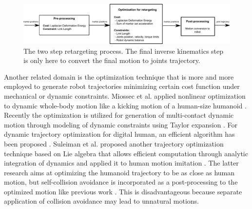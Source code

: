 \documentclass[letterpaper, 10 pt, conference]{ieeeconf}  %
\begin{document}
\begin{figure}[t]
\begin{center}
  \includegraphics[width=\linewidth]{figure/architecture.pdf}
  \caption{The two step retargeting process. The final inverse
    kinematics step is only here to convert the final motion to joints
    trajectory.}
  \label{fig:algorithm}
\end{center}
\end{figure}

Another related domain is the optimization technique that is more and
more employed to generate robot trajectories minimizing certain cost
function under mechanical or dynamic constraints. Miossec et
al. applied nonlinear optimization to dynamic whole-body motion like a
kicking motion of a human-size humanoid \cite{Miossec06ROBIO}.
Recently the optimization is utilized for generation of multi-contact
dynamic motion through modeling of dynamic constraints using Taylor
expansion \cite{Lengagne13IJRR}. 
For dynamic trajectory optimization for digital human, an efficient algorithm
has been proposed \cite{Todorov2012IROS-online,Todorov2012IROS-contact}.
Suleiman et al. proposed another
trajectory optimization technique based on Lie algebra that allows
efficient computation through analytic integration of dynamics
\cite{Suleiman07Humanoids} and applied it to human motion imitation
\cite{Suleiman08ICRA}.  The latter research aims at optimizing the
humanoid trajectory to be as close as human motion, but self-collision
avoidance is incorporated as a post-processing to the optimized motion
like previous work \cite{Nakaoka12Humanoids}. This is disadvantageous
because separate application of collision avoidance may lead to
unnatural motions.
\end{document}
